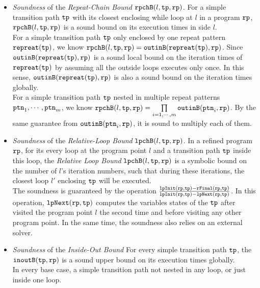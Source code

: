 \begin{itemize}
\item 
\emph{Soundness} of the \emph{Repeat-Chain Bound}  $\mathtt{rpchB}(l, \mathtt{tp}, \mathtt{rp})$.
For a simple transition path $\mathtt{tp}$ with its closest enclosing while loop at $l$ in a program $\mathtt{rp}$, $\mathtt{rpchB}(l, \mathtt{tp}, \mathtt{rp})$
is a sound bound on its execution times in side $l$.
\\
For a simple transition path $\mathtt{tp}$ only enclosed by one repeat pattern $\mathtt{repreat}(\mathtt{tp})$, 
we know $\mathtt{rpchB}(l, \mathtt{tp}, \mathtt{rp}) = \mathtt{outinB}(\mathtt{repreat}(\mathtt{tp}), \mathtt{rp})$.
Since $\mathtt{outinB}(\mathtt{repreat}(\mathtt{tp}), \mathtt{rp})$ is a sound local bound on the iteration times
of $\mathtt{repreat}(\mathtt{tp})$ by assuming all the outside loops executes only once.
In this sense, $\mathtt{outinB}(\mathtt{repreat}(\mathtt{tp}), \mathtt{rp})$ is also a sound bound on the iteration times globally.
\\
For a simple transition path $\mathtt{tp}$ nested in multiple repeat patterns $\mathtt{ptn}_1, \cdots, \mathtt{ptn}_m$,
we know $\mathtt{rpchB}(l, \mathtt{tp}, \mathtt{rp}) = \prod\limits_{i = 1, \cdots, m}\mathtt{outinB}(\mathtt{ptn}_i, \mathtt{rp})$.
By the same guarantee from $\mathtt{outinB}(\mathtt{ptn}_i, \mathtt{rp})$, it is sound to multiply each of them.
\item 
\emph{Soundness} of the \emph{Relative-Loop Bound}  $\mathtt{lpchB}(l, \mathtt{tp}, \mathtt{rp})$. In a refined program $\mathtt{rp}$,
for its every loop at the program point $l$ and a transition path $\mathtt{tp}$ inside this loop,
the \emph{Relative Loop Bound} $\mathtt{lpchB}(l, \mathtt{tp}, \mathtt{rp})$ is a symbolic bound
on the number of $l$'s iteration numbers,
such that during these iterations, the closest loop $l'$ enclosing $\mathtt{tp}$ will be executed.
\\
The soundness is guaranteed by the operation
 $\frac{\mathtt{lpInit}(\mathtt{rp}, \mathtt{tp}) - \mathtt{rFinal}(\mathtt{rp}, \mathtt{tp})}{\mathtt{lpInit}(\mathtt{rp}, \mathtt{tp}) - \mathtt{lpNext}(\mathtt{rp}, \mathtt{tp})}$.
 In this operation, $\mathtt{lpNext}(\mathtt{rp}, \mathtt{tp})$ computes the variables states of the $\mathtt{tp}$
after visited the program point $l$ the second time and before visiting any other program point.
In the same time, the soundness also relies on an external solver. 
\item 
\emph{Soundness} of the \emph{Inside-Out Bound}  
For every simple transition path $\mathtt{tp}$, the $\mathtt{inoutB}(\mathtt{tp}, \mathtt{rp})$
is a sound upper bound on its execution times globally.
\\
In every base case, a simple transition path not nested in any loop, or just inside one loop.

\end{itemize}
